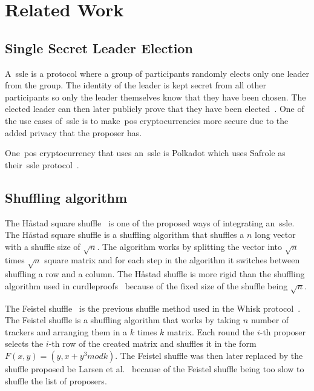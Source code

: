 \section{Related Work}\label{sec:related-work}




\subsection{Single Secret Leader Election}\label{sec:related-work-SSLE}
A~\gls{ssle} is a protocol where a group of participants randomly elects only one leader from the group.
The identity of the leader is kept secret from all other participants so only the leader themselves know that they have been chosen.
The elected leader can then later publicly prove that they have been elected~\cite{10.1145/3419614.3423258}.
One of the use cases of~\gls{ssle} is to make~\gls{pos} cryptocurrencies more secure due to the added privacy that the proposer has.

One~\gls{pos} cryptocurrency that uses an~\gls{ssle} is Polkadot which uses Safrole as their~\gls{ssle} protocol~\cite{safrole}.



\subsection{Shuffling algorithm}\label{sec:related-work-Shuffling-algorithm}

The Håstad square shuffle~\cite{haastad2006square} is one of the proposed ways of integrating an~\gls{ssle}.
The Håstad square shuffle is a shuffling algorithm that shuffles a $n$ long vector with a shuffle size of $\sqrt {n}$.
The algorithm works by splitting the vector into $\sqrt {n}$ times $\sqrt {n}$ square matrix and for each step in the algorithm it switches between shuffling a row and a column.
The Håstad shuffle is more rigid than the shuffling algorithm used in curdleproofs~\cite{cryptoeprint:2022/560} because of the fixed size of the shuffle being $\sqrt {n}$.

The Feistel shuffle~\cite{Feistle} is the previous shuffle method used in the Whisk protocol~\cite{Whisk2024}.
The Feistel shuffle is a shuffling algorithm that works by taking $n$ number of trackers and arranging them in a $k$ times $k$ matrix.
Each round the $i$-th proposer selects the $i$-th row of the created matrix and shuffles it in the form $F(x,y)=(y,x+y^3 mod k)$.
The Feistel shuffle was then later replaced by the shuffle proposed be Larsen et al.~\cite{cryptoeprint:2022/560} because of the Feistel shuffle being too slow to shuffle the list of proposers.


